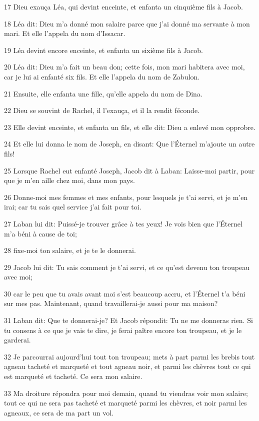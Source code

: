 \par 17 Dieu exauça Léa, qui devint enceinte, et enfanta un cinquième fils à Jacob.
\par 18 Léa dit: Dieu m'a donné mon salaire parce que j'ai donné ma servante à mon mari. Et elle l'appela du nom d'Issacar.
\par 19 Léa devint encore enceinte, et enfanta un sixième fils à Jacob.
\par 20 Léa dit: Dieu m'a fait un beau don; cette fois, mon mari habitera avec moi, car je lui ai enfanté six fils. Et elle l'appela du nom de Zabulon.
\par 21 Ensuite, elle enfanta une fille, qu'elle appela du nom de Dina.
\par 22 Dieu se souvint de Rachel, il l'exauça, et il la rendit féconde.
\par 23 Elle devint enceinte, et enfanta un fils, et elle dit: Dieu a enlevé mon opprobre.
\par 24 Et elle lui donna le nom de Joseph, en disant: Que l'Éternel m'ajoute un autre fils!
\par 25 Lorsque Rachel eut enfanté Joseph, Jacob dit à Laban: Laisse-moi partir, pour que je m'en aille chez moi, dans mon pays.
\par 26 Donne-moi mes femmes et mes enfants, pour lesquels je t'ai servi, et je m'en irai; car tu sais quel service j'ai fait pour toi.
\par 27 Laban lui dit: Puissé-je trouver grâce à tes yeux! Je vois bien que l'Éternel m'a béni à cause de toi;
\par 28 fixe-moi ton salaire, et je te le donnerai.
\par 29 Jacob lui dit: Tu sais comment je t'ai servi, et ce qu'est devenu ton troupeau avec moi;
\par 30 car le peu que tu avais avant moi s'est beaucoup accru, et l'Éternel t'a béni sur mes pas. Maintenant, quand travaillerai-je aussi pour ma maison?
\par 31 Laban dit: Que te donnerai-je? Et Jacob répondit: Tu ne me donneras rien. Si tu consens à ce que je vais te dire, je ferai paître encore ton troupeau, et je le garderai.
\par 32 Je parcourrai aujourd'hui tout ton troupeau; mets à part parmi les brebis tout agneau tacheté et marqueté et tout agneau noir, et parmi les chèvres tout ce qui est marqueté et tacheté. Ce sera mon salaire.
\par 33 Ma droiture répondra pour moi demain, quand tu viendras voir mon salaire; tout ce qui ne sera pas tacheté et marqueté parmi les chèvres, et noir parmi les agneaux, ce sera de ma part un vol.
